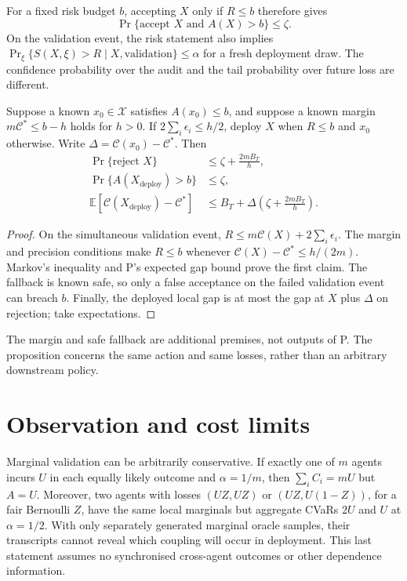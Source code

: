 \documentclass{article}
\begin{document}
For a fixed risk budget \(b\), accepting \(X\) only if \(R\le b\)
therefore gives
\[
\Pr\{\text{accept }X\text{ and }A(X)>b\}\le\zeta.
\]
On the validation event, the risk statement also implies
\(\Pr_{\xi}\{S(X,\xi)>R\mid X,\text{validation}\}\le\alpha\)
for a fresh deployment draw.  The confidence probability over the
audit and the tail probability over future loss are different.

\begin{proposition}\label{prop:selective}
Suppose a known \(x_0\in\mathcal X\) satisfies \(A(x_0)\le b\),
and suppose a known margin \(m\mathcal C^*\le b-h\) holds for
\(h>0\).  If \(2\sum_i\epsilon_i\le h/2\), deploy \(X\) when
\(R\le b\) and \(x_0\) otherwise.  Write
\(\Delta=\mathcal C(x_0)-\mathcal C^*\).  Then
\[
\begin{aligned}
\Pr\{\text{reject }X\}&\le\zeta+\frac{2mB_T}{h},\\
\Pr\{A(X_{\mathrm{deploy}})>b\}&\le\zeta,\\
\mathbb E[\mathcal C(X_{\mathrm{deploy}})-\mathcal C^*]
&\le B_T+\Delta\left(\zeta+\frac{2mB_T}{h}\right).
\end{aligned}
\]
\end{proposition}

\begin{proof}
On the simultaneous validation event,
\(R\le m\mathcal C(X)+2\sum_i\epsilon_i\).  The margin and
precision conditions make \(R\le b\) whenever
\(\mathcal C(X)-\mathcal C^*\le h/(2m)\).  Markov's inequality and
P's expected gap bound prove the first claim.  The fallback is known
safe, so only a false acceptance on the failed validation event can
breach \(b\).  Finally, the deployed local gap is at most the gap at
\(X\) plus \(\Delta\) on rejection; take expectations.
\end{proof}

The margin and safe fallback are additional premises, not outputs of
P.  The proposition concerns the same action and same losses, rather
than an arbitrary downstream policy.

\section{Observation and cost limits}

Marginal validation can be arbitrarily conservative.  If exactly one
of \(m\) agents incurs \(U\) in each equally likely outcome and
\(\alpha=1/m\), then \(\sum_i C_i=mU\) but \(A=U\).
Moreover, two agents with losses \((UZ,UZ)\) or
\((UZ,U(1-Z))\), for a fair Bernoulli \(Z\), have the same local
marginals but aggregate CVaRs \(2U\) and \(U\) at \(\alpha=1/2\).
With only separately generated marginal oracle samples, their
transcripts cannot reveal which coupling will occur in deployment.
This last statement assumes no synchronised cross-agent outcomes or
other dependence information.
\end{document}
